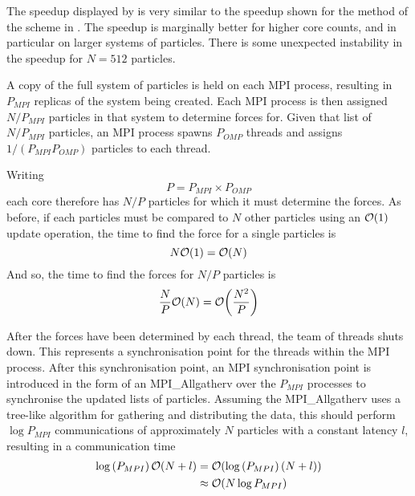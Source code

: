 \vZeroSpeedupExplanation
    {}
    {\sharedandreplicateddata{}}
    {\pairoperation{}}

The speedup displayed by 
is very similar to the speedup shown for the \pairoperation{}
method of the \replicateddata{} scheme in
.
%
The speedup is marginally better for higher core counts, and in
particular on larger systems of particles.
%
There is some unexpected instability in the speedup for $N=512$ particles.


%
A copy of the full system of particles is held on each MPI process,
resulting in $P_{MPI}$ replicas of the system being created.
%
Each MPI process is then assigned $N/P_{MPI}$ particles in that system
to determine forces for.
%
Given that list of $N/P_{MPI}$ particles,
an MPI process spawns $P_{OMP}$ threads
and assigns $1/(P_{MPI} P_{OMP})$ particles to each thread.

Writing
\begin{equation}
    \label{eqn:p_eq_pmpi_pomp}
    P = P_{MPI} \times{} P_{OMP}
\end{equation}
each core therefore has $N/P$ particles
for which it must determine the forces.
%
As before, if each particles must be compared to $N$ other particles
using an $\mathcal{O}{\left({ 1 }\right)}$ update operation, the time to find the force for
a single particles is
\begin{equation}
    N\mathcal{O}{\left({ 1 }\right)} = \mathcal{O}{\left({ N }\right)}
\end{equation}
And so, the time to find the forces for $N/P$ particles is
\begin{equation}
    \label{eqn:shared_and_replicated_calculation_time}
    \frac{N}{P}\mathcal{O}{\left({ N }\right)} = \mathcal{O}{\left({ \frac{N^2}{P} }\right)}
\end{equation}

%
After the forces have been determined by each thread, the team of threads
shuts down.
%
This represents a synchronisation point for the threads within the
MPI process.
%
After this \openmp{} synchronisation point,
an MPI synchronisation point is introduced in the form of
an MPI\_Allgatherv over the $P_{MPI}$ processes
to synchronise the updated lists of particles.
%
Assuming the MPI\_Allgatherv uses a tree-like algorithm for
gathering and distributing the data, this should perform
$\log{P_{MPI}}$ communications of approximately $N$ particles
with a constant latency $l$, resulting in a communication time
\begin{equation}
    \label{eqn:shared_andreplicated_communication_time}
    \begin{split}
        \log{(P_{MPI})}\,\mathcal{O}{\left({ N + l }\right)} 
            &= \mathcal{O}{\left({ \log{(P_{MPI})}\,(N+l) }\right)} \\
            &\approx{} \mathcal{O}{\left({ N\log{P_{MPI}} }\right)}
    \end{split}
\end{equation}

